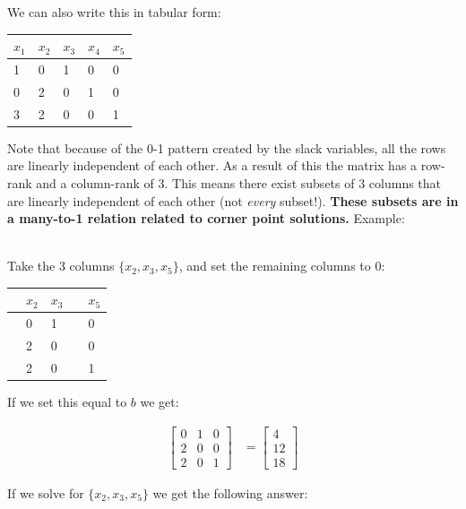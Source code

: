 \documentclass[12pt]{article}
\begin{document}
\noindent
We can also write this in tabular form:

\begin{table}[h]
    \centering
    \begin{tabular}{lllll}
    $x_1$ & $x_2$ & $x_3$ & $x_4$ & $x_5$ \\ \hline
    1 & 0 & 1 & 0 & 0 \\
    0 & 2 & 0 & 1 & 0 \\
    3 & 2 & 0 & 0 & 1
    \end{tabular}
\end{table}

\noindent
Note that because of the 0-1 pattern created by the slack variables, all the rows are linearly independent of each other.
As a result of this the matrix has a row-rank and a column-rank of 3.
This means there exist subsets of 3 columns that are linearly independent of each other (not \textit{every} subset!).
\textbf{These subsets are in a many-to-1 relation related to corner point solutions.}
Example:

\noindent
\\
Take the 3 columns $\{ x_2, x_3, x_5 \}$, and set the remaining columns to 0:

\begin{table}[h]
    \centering
    \begin{tabular}{lllll}
    & $x_2$ & $x_3$ & & $x_5$ \\ \hline
    & 0 & 1 & & 0 \\
    & 2 & 0 & & 0 \\
    & 2 & 0 & & 1
    \end{tabular}
\end{table}

\noindent
If we set this equal to $b$ we get:

\begin{align*}
    \begin{bmatrix}
        0 & 1 & 0 \\
        2 & 0 & 0 \\
        2 & 0 & 1
    \end{bmatrix}
    & = 
    \begin{bmatrix}
        4 \\
        12 \\
        18
    \end{bmatrix}
\end{align*}

\newpage
\noindent
If we solve for $\{ x_2, x_3, x_5 \}$ we get the following answer:
\end{document}
